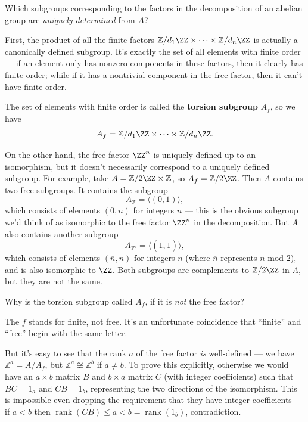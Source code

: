 \begin{qq}
Which subgroups corresponding to the factors in the decomposition of an abelian group are \emph{uniquely determined} from $A$?
\end{qq}

First, the product of all the finite factors $\mathbb{Z}/d_1\ZZ \times \cdots \times \mathbb{Z}/d_n\ZZ$ is actually a canonically defined subgroup. It's exactly the set of all elements with finite order --- if an element only has nonzero components in these factors, then it clearly has finite order; while if it has a nontrivial component in the free factor, then it can't have finite order. 

\begin{definition}
    The set of elements with finite order is called the \textbf{torsion subgroup} $A_f$, so we have \[A_f = \mathbb{Z}/d_1\ZZ \times \cdots \times \mathbb{Z}/d_n\ZZ.\] 
\end{definition}

On the other hand, the free factor $\ZZ^n$ is uniquely defined up to an isomorphism, but it doesn't necessarily correspond to a uniquely defined subgroup. For example, take $A = \mathbb{Z}/2\ZZ \times \mathbb{Z}$, so $A_f = \mathbb{Z}/2\ZZ$. Then $A$ contains two free subgroups. It contains the subgroup \[A_{\mathbb{Z}} = \langle (0, 1)\rangle,\] which consists of elements $(0, n)$ for integers $n$ --- this is the obvious subgroup we'd think of as isomorphic to the free factor $\ZZ^n$ in the decomposition. But $A$ also contains another subgroup \[A_{\mathbb{Z}'} = \langle (\overline{1}, 1)\rangle,\] which consists of elements $(\overline{n}, n)$ for integers $n$ (where $\overline{n}$ represents $n$ mod $2$), and is also isomorphic to $\ZZ.$ Both subgroups are complements to $\mathbb{Z}/2\ZZ$ in $A$, but they are not the same. 

\begin{question}
Why is the torsion subgroup called $A_f$, if it is \emph{not} the free factor? 
\end{question}

\begin{ans}
The $f$ stands for finite, not free. It's an unfortunate coincidence that ``finite'' and ``free'' begin with the same letter.
\end{ans}

But it's easy to see that the rank $a$ of the free factor \emph{is} well-defined --- we have $\mathbb{Z}^a = A/A_f$, but $\mathbb{Z}^a \not\cong \mathbb{Z}^b$ if $a \neq b$. To prove this explicitly, otherwise we would have an $a \times b$ matrix $B$ and $b \times a$ matrix $C$ (with integer coefficients) such that $BC = 1_a$ and $CB = 1_b$, representing the two directions of the isomorphism. This is impossible even dropping the requirement that they have integer coefficients --- if $a < b$ then $\operatorname{rank}(CB) \leq a < b = \operatorname{rank}(1_b)$, contradiction.


